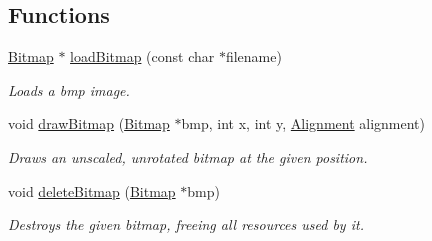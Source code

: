\subsection*{Functions}
\begin{DoxyCompactItemize}
\item 
\mbox{\hyperlink{struct_bitmap}{Bitmap}} $\ast$ \mbox{\hyperlink{group__bitmap_ga3506880ffd407c36eb8aaddd2c1606d2}{load\+Bitmap}} (const char $\ast$filename)
\begin{DoxyCompactList}\small\item\em Loads a bmp image. \end{DoxyCompactList}\item 
void \mbox{\hyperlink{group__bitmap_ga6652acd82369d03df807a689437efc1b}{draw\+Bitmap}} (\mbox{\hyperlink{struct_bitmap}{Bitmap}} $\ast$bmp, int x, int y, \mbox{\hyperlink{group__bitmap_gacdfaca60ec19c0265bac2692d7982726}{Alignment}} alignment)
\begin{DoxyCompactList}\small\item\em Draws an unscaled, unrotated bitmap at the given position. \end{DoxyCompactList}\item 
void \mbox{\hyperlink{group__bitmap_ga08c1d4f4fff81df260d979ea8fc1aa61}{delete\+Bitmap}} (\mbox{\hyperlink{struct_bitmap}{Bitmap}} $\ast$bmp)
\begin{DoxyCompactList}\small\item\em Destroys the given bitmap, freeing all resources used by it. \end{DoxyCompactList}\end{DoxyCompactItemize}

